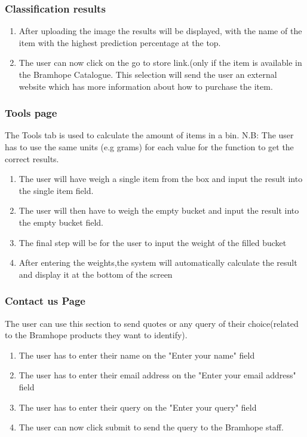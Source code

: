 \documentclass[a4paper, 12pt]{article}
\begin{document}
\subsubsection{Classification results}
\begin{enumerate}
\item After uploading the image the results will be displayed, with the name of the item  with the highest prediction percentage at the top.
\item The user can now click on the go to store link.(only if the item is available in the Bramhope Catalogue. This selection will send the user an external website which has more information about how to purchase the item.
\end{enumerate}


\subsubsection{Tools page}
The Tools tab is used to calculate the amount of items in a bin.\newline
N.B: The user has to use the same units (e.g grams) for each value for the function to get the correct results. 
\begin{enumerate}
\item The user will have weigh a single item from the box and input the result into the single item field.
\item The user will then have to weigh the empty bucket and input the result into the empty bucket field.
\item The final step will be for the user to input the weight of the filled bucket
\item After entering the weights,the system will automatically calculate the result and display it at the bottom of the screen
\end{enumerate}

\subsubsection{Contact us Page}
The user can use this section to send quotes or any query of their choice(related to the Bramhope products they want to identify).
\newline
\begin{enumerate}
\item The user has to enter their name on the "Enter your name" field
\item The user has to enter their email address on the "Enter your email address" field
\item The user has to enter their query on the "Enter your query" field
\item The user can now click submit to send the query to the Bramhope staff.
\end{enumerate}
\end{document}
